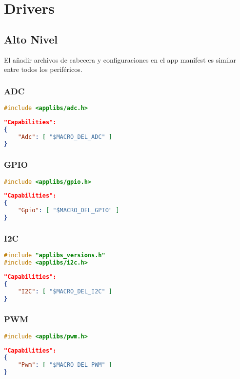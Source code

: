 \section{Drivers}
\subsection{Alto Nivel}
El añadir archivos de cabecera y configuraciones en el app manifest es similar entre todos los periféricos.
\subsubsection{ADC}
\begin{lstlisting}[language = C, firstnumber=0]
#include <applibs/adc.h>
\end{lstlisting}
\begin{lstlisting}[language = json, firstnumber=0]	
"Capabilities": 
{  
	"Adc": [ "$MACRO_DEL_ADC" ] 
}
\end{lstlisting}

\subsubsection{GPIO}
\begin{lstlisting}[language = C, firstnumber=0]
#include <applibs/gpio.h>
\end{lstlisting}
\begin{lstlisting}[language = json, firstnumber=0]	
"Capabilities": 
{  
	"Gpio": [ "$MACRO_DEL_GPIO" ] 
}
\end{lstlisting}

\subsubsection{I2C}
\begin{lstlisting}[language = C, firstnumber=0]
#include "applibs_versions.h"
#include <applibs/i2c.h>
\end{lstlisting}
\begin{lstlisting}[language = json, firstnumber=0]		"Capabilities":
{  
	"I2C": [ "$MACRO_DEL_I2C" ] 
}
\end{lstlisting}

\subsubsection{PWM}
\begin{lstlisting}[language = C, firstnumber=0]
#include <applibs/pwm.h>
\end{lstlisting}
\begin{lstlisting}[language = json, firstnumber=0]	
"Capabilities": 
{  
	"Pwm": [ "$MACRO_DEL_PWM" ] 
}
\end{lstlisting}

